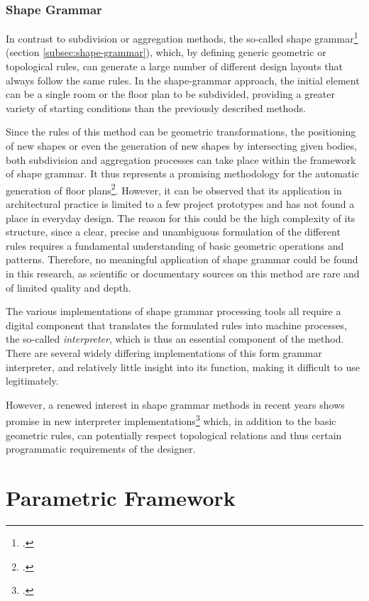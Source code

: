 \documentclass[a4paper, 12pt]{report}
\begin{document}
\subsubsection{Shape Grammar}\label{subsubsec:shape-grammar}

In contrast to subdivision or aggregation methods, the so-called shape grammar\footcite{hong2022five} (section \ref{subsec:shape-grammar}), which, by defining generic geometric or topological rules, can generate a large number of different design layouts that always follow the same rules. In the shape-grammar approach, the initial element can be a single room or the floor plan to be subdivided, providing a greater variety of starting conditions than the previously described methods.

Since the rules of this method can be geometric transformations, the positioning of new shapes or even the generation of new shapes by intersecting given bodies, both subdivision and aggregation processes can take place within the framework of shape grammar. It thus represents a promising methodology for the automatic generation of floor plans\footcite{ruiz2013design}. However, it can be observed that its application in architectural practice is limited to a few project prototypes and has not found a place in everyday design. The reason for this could be the high complexity of its structure, since a clear, precise and unambiguous formulation of the different rules requires a fundamental understanding of basic geometric operations and patterns. Therefore, no meaningful application of shape grammar could be found in this research, as scientific or documentary sources on this method are rare and of limited quality and depth.

The various implementations of shape grammar processing tools all require a digital component that translates the formulated rules into machine processes, the so-called \textit{interpreter}, which is thus an essential component of the method. There are several widely differing implementations of this form grammar interpreter, and relatively little insight into its function, making it difficult to use legitimately.

However, a renewed interest in shape grammar methods in recent years shows promise in new interpreter implementations\footcite{muslimin2023experience} which, in addition to the basic geometric rules, can potentially respect topological relations and thus certain programmatic requirements of the designer.

\section{Parametric Framework}\label{sec:parametric-framework}
\end{document}
